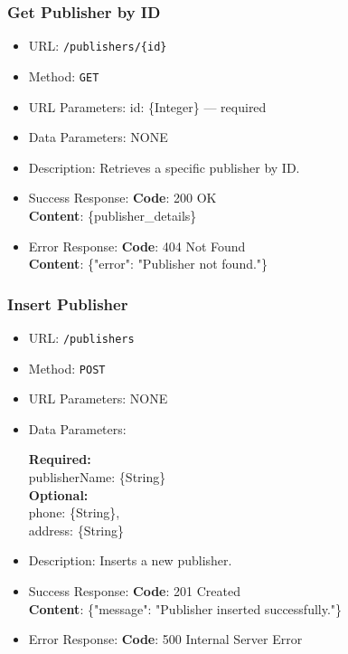 \subsubsection*{Get Publisher by ID}

\begin{itemize}
    \item URL: \texttt{/publishers/\{id\}}
    \item Method: \texttt{GET}
    \item URL Parameters: id: \{Integer\} — required
    \item Data Parameters: NONE
    \item Description: Retrieves a specific publisher by ID.
    
    \item Success Response: \newline
    \textbf{Code}: 200 OK \\
    \textbf{Content}: \{publisher\_details\}
    
    \item Error Response: \newline
    \textbf{Code}: 404 Not Found \\
    \textbf{Content}: \{"error": "Publisher not found."\}
\end{itemize}

\subsubsection*{Insert Publisher}

\begin{itemize}
    \item URL: \texttt{/publishers}
    \item Method: \texttt{POST}
    \item URL Parameters: NONE
    \item Data Parameters:

    \textbf{Required:} \\
    publisherName: \{String\} \\
    
    \textbf{Optional:} \\
    phone: \{String\}, \\
    address: \{String\}

    \item Description: Inserts a new publisher.

    \item Success Response: \newline
    \textbf{Code}: 201 Created \\
    \textbf{Content}: \{"message": "Publisher inserted successfully."\}

    \item Error Response: \newline
    \textbf{Code}: 500 Internal Server Error
\end{itemize}

